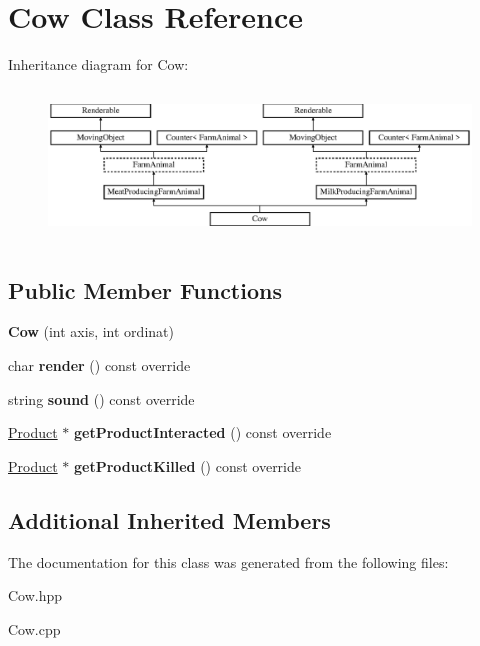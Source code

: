 \hypertarget{class_cow}{}\section{Cow Class Reference}
\label{class_cow}
Inheritance diagram for Cow\+:\begin{figure}[H]
\begin{center}
\leavevmode
\includegraphics[height=4.046243cm]{class_cow}
\end{center}
\end{figure}
\subsection*{Public Member Functions}
\begin{DoxyCompactItemize}
\item 
\mbox{\label{class_cow_a56febc0eeb2816d941b02dfbd32c8c80}} 
{\bfseries Cow} (int axis, int ordinat)
\item 
\mbox{\label{class_cow_abbe6d9b43db5fbf3f625476f5f77e1f3}} 
char {\bfseries render} () const override
\item 
\mbox{\label{class_cow_ae70afcf5819c61b8f761dd0e915cea20}} 
string {\bfseries sound} () const override
\item 
\mbox{\label{class_cow_a55bea24361acf43f0be069796275616d}} 
\mbox{\hyperlink{class_product}{Product}} $\ast$ {\bfseries get\+Product\+Interacted} () const override
\item 
\mbox{\label{class_cow_add32ef2511b85a224944a4daefb8c036}} 
\mbox{\hyperlink{class_product}{Product}} $\ast$ {\bfseries get\+Product\+Killed} () const override
\end{DoxyCompactItemize}
\subsection*{Additional Inherited Members}


The documentation for this class was generated from the following files\+:\begin{DoxyCompactItemize}
\item 
Cow.\+hpp\item 
Cow.\+cpp\end{DoxyCompactItemize}
